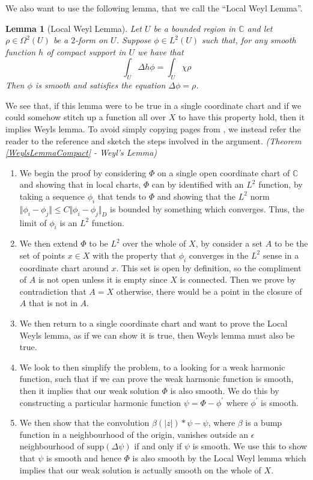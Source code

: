 \documentclass[11pt]{report}
\newtheorem{lemma}[thm]{Lemma}
\theoremstyle{definition}
\newenvironment{sproof}{%
  \renewcommand{\proofname}{Sketch Proof}\proof}{\endproof}
\begin{document}
We also want to use the following lemma, that we call the ``Local Weyl Lemma''.
\begin{lemma}[Local Weyl Lemma]\label{WeylsLemmaLocal}
  Let $U$ be a bounded region in $\mathbb{C}$ and let $\rho \in \Omega^2(U)$ be a $2$-form on $U$. Suppose $\phi \in L^2(U)$ such that, for any smooth function $h$ of compact support in $U$ we have that 
  \[\int_U \Delta h\phi = \int_U \chi\rho\]
  Then $\phi$ is smooth and satisfies the equation $\Delta \phi = \rho$.
\end{lemma}
We see that, if this lemma were to be true in a single coordinate chart and if we could somehow stitch up a function all over $X$ to have this property hold, then it implies Weyls lemma. To avoid simply copying pages from \cite[(Chapter 10)]{donaldson}, we instead refer the reader to the reference and sketch the steps involved in the argument.
\begin{sproof}\emph{(Theorem \ref{WeylsLemmaCompact} - Weyl's Lemma)}
  \hspace{1pt}
  \begin{enumerate}
    \item We begin the proof by considering $\Phi$ on a single open coordinate chart of $\mathbb{C}$ and showing that in local charts, $\Phi$ can by identified with an $L^2$ function, by taking a sequence $\phi_i$ that tends to $\Phi$ and showing that the $L^2$ norm $\Vert \phi_i - \phi_j \Vert \leq C \Vert \phi_i - \phi_j \Vert_D$ is bounded by something which converges. Thus, the limit of $\phi_i$ is an $L^2$ function.
    \item We then extend $\Phi$ to be $L^2$ over the whole of $X$, by consider a set $A$ to be the set of points $x \in X$ with the property that $\phi_i$ converges in the $L^2$ sense in a coordinate chart around $x$. This set is open by definition, so the compliment of $A$ is not open unless it is empty since $X$ is connected. Then we prove by contradiction that $A = X$ otherwise, there would be a point in the closure of $A$ that is not in $A$.
    \item We then return to a single coordinate chart and want to prove the Local Weyls lemma, as if we can show it is true, then Weyls lemma must also be true.
    \item We look to then simplify the problem, to a looking for a weak harmonic function, such that if we can prove the weak harmonic function is smooth, then it implies that our weak solution $\Phi$ is also smooth. We do this by constructing a particular harmonic function $\psi = \Phi - \phi^{\prime}$ where $\phi^{\prime}$ is smooth.
    \item We then show that the convolution $\beta(|z|)*\psi - \psi$, where $\beta$ is a bump function in a neighbourhood of the origin, vanishes outside an $\epsilon$ neighbourhood of $\text{supp}(\Delta \psi)$ if and only if $\psi$ is smooth. We use this to show that $\psi$ is smooth and hence $\Phi$ is also smooth by the Local Weyl lemma which implies that our weak solution is actually smooth on the whole of $X$.
  \end{enumerate}
\end{sproof}
\end{document}
